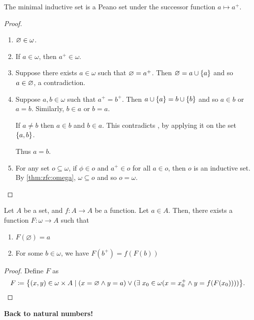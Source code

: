 \begin{thm}
    The minimal inductive set is a Peano set under the successor function
    $a \mapsto a^{+}$.
\end{thm}
\begin{proof} \leavevmode
    \begin{enumerate}[label=(P\arabic*)]
        \item $\varnothing \in \omega$.
        \item If $a \in \omega$, then $a^{+} \in \omega$.
        \item Suppose there exists $a \in \omega$ such that $\varnothing = a^{+}$.
            Then $\O = a \cup \set{a}$ and so $a \in \varnothing$, a contradiction.
        \item Suppose $a, b \in \omega$ such that $a^{+} = b^{+}$.
            Then $a \cup \set{a} = b \cup \set{b}$ and so
            $a \in b$ or $a = b$.
            Similarly, $b \in a$ or $b = a$.

            If $a \neq b$ then $a \in b$ and $b \in a$.
            This contradicts ,
            by applying it on the set $\set{a, b}$.

            Thus $a = b$.
        \item For any set $o \subseteq \omega$, if $\phi \in o$ and
            $a^{+} \in o$ for all $a \in o$, then $o$ is an inductive set.
            By \cref{thm:zfc:omega}, $\omega \subseteq o$ and so $o = \omega$.
            \qedhere
    \end{enumerate}
\end{proof}

\begin{thm} \label{thm:zfc:recursion}
    Let $A$ be a set, and $f: A \to A$ be a function. Let $a \in A$. Then, there exists a function $F: \omega \to A$ such that
    \begin{enumerate}[label=(\alph*)]
        \item $F(\varnothing) = a$
        \item For some $b \in \omega$, we have $F(b^{+}) = f(F(b))$
    \end{enumerate}
\end{thm}
\begin{proof}
    Define $F$ as \[
        F \coloneqq \set{(x, y) \in \omega \times A \mid
            (x = \O \land y = a) \lor
            (\exists\; x_{0} \in \omega (x = x_{0}^{+} \land y = f(F(x_{0}))))}.
            \qedhere
    \]
\end{proof}

\textbf{Back to natural numbers!}

